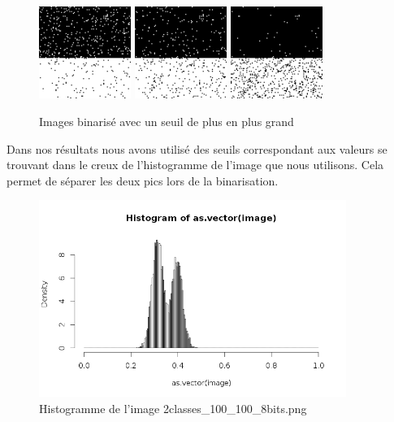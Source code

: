 \documentclass[a4paper,11pt]{article}
\begin{document}
  \begin{figure}[H]
    \center
    \includegraphics[width=3cm]{resultat/bin35.png}
    \includegraphics[width=3cm]{resultat/bin36.png}
    \includegraphics[width=3cm]{resultat/bin37.png}
    \caption{Images binarisé avec un seuil de plus en plus grand}
  \end{figure}
  
  Dans nos résultats nous avons utilisé des seuils correspondant aux valeurs se trouvant dans le creux
  de l'histogramme de l'image que nous utilisons. Cela permet de séparer les deux pics lors de la 
  binarisation.\\
  
  \begin{figure}[H]
    \center
    \includegraphics[width=10cm]{resultat/hist_image_principal.png}
    \caption{Histogramme de l'image 2classes\_100\_100\_8bits.png}
  \end{figure}
  
\end{document}
